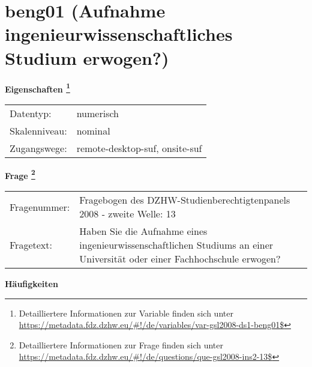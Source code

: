 
    \setcounter{footnote}{0}

    \vspace*{-1.8cm}
	\section{beng01 (Aufnahme ingenieurwissenschaftliches Studium erwogen?)}
	\label{section:beng01}



    \vspace*{0.5cm}
    \noindent\textbf{Eigenschaften
	\footnote{Detailliertere Informationen zur Variable finden sich unter
		\url{https://metadata.fdz.dzhw.eu/\#!/de/variables/var-gsl2008-ds1-beng01$}}}\\
	\begin{tabularx}{\hsize}{@{}lX}
	Datentyp: & numerisch \\
	Skalenniveau: & nominal \\
	Zugangswege: &
	  remote-desktop-suf, 
	  onsite-suf
 \\
    \end{tabularx}



				\vspace*{0.5cm}
                \noindent\textbf{Frage
	                \footnote{Detailliertere Informationen zur Frage finden sich unter
		              \url{https://metadata.fdz.dzhw.eu/\#!/de/questions/que-gsl2008-ins2-13$}}}\\
				\begin{tabularx}{\hsize}{@{}lX}
					Fragenummer: &
					  Fragebogen des DZHW-Studienberechtigtenpanels 2008 - zweite Welle:
					  13
 \\
					Fragetext: & Haben Sie die Aufnahme eines ingenieurwissenschaftlichen Studiums an einer Universität oder einer Fachhochschule erwogen? \\
				\end{tabularx}





        		\vspace*{0.5cm}
                \noindent\textbf{Häufigkeiten}

